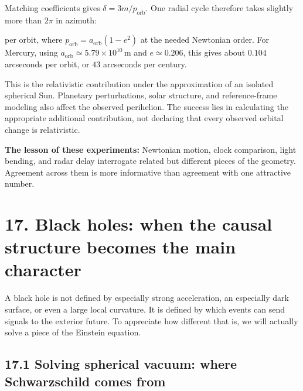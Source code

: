 \documentclass[
  11pt,
  letterpaper,
  oneside,
  openany]{scrbook}
\begin{document}
Matching coefficients gives \(\delta=3m/p_{\mathrm{orb}}\). One radial
cycle therefore takes slightly more than \(2\pi\) in azimuth:

\begin{center}
\begingroup
{}
\ifdim\wd\grmathbox>\linewidth
\resizebox{\linewidth}{!}{\usebox{\grmathbox}}
\else\usebox{\grmathbox}\fi
\endgroup
\end{center}

per orbit, where \(p_{\mathrm{orb}}=a_{\mathrm{orb}}(1-e^2)\) at the
needed Newtonian order. For Mercury, using
\(a_{\mathrm{orb}}\simeq5.79\times10^{10}\,\mathrm m\) and
\(e\simeq0.206\), this gives about \(0.104\) arcseconds per orbit, or
\(43\) arcseconds per century.

This is the relativistic contribution under the approximation of an
isolated spherical Sun. Planetary perturbations, solar structure, and
reference-frame modeling also affect the observed perihelion. The
success lies in calculating the appropriate additional contribution, not
declaring that every observed orbital change is relativistic.

\textbf{The lesson of these experiments:} Newtonian motion, clock
comparison, light bending, and radar delay interrogate related but
different pieces of the geometry. Agreement across them is more
informative than agreement with one attractive number.

\hypertarget{chapter-17}{%
\chapter{17. Black holes: when the causal structure becomes the main
character}\label{chapter-17}}

A black hole is not defined by especially strong acceleration, an
especially dark surface, or even a large local curvature. It is defined
by which events can send signals to the exterior future. To appreciate
how different that is, we will actually solve a piece of the Einstein
equation.

\hypertarget{solving-spherical-vacuum-where-schwarzschild-comes-from}{%
\section{17.1 Solving spherical vacuum: where Schwarzschild comes
from}\label{solving-spherical-vacuum-where-schwarzschild-comes-from}}
\end{document}
